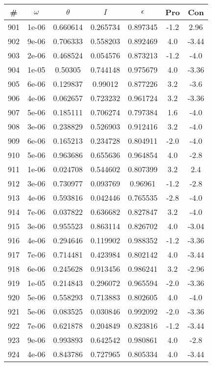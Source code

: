\begin{table}
\begin{tabular}{c|c|c|c|c|c|c}
\# & $\omega$ & $\theta$ & $I$ & $\epsilon$ & Pro & Con\\
\hline
901 & 1e-06 & 0.660614 & 0.265734 & 0.897345 & -1.2 & 2.96\\
902 & 9e-06 & 0.706333 & 0.558203 & 0.892469 & 4.0 & -3.44\\
903 & 2e-06 & 0.468524 & 0.054576 & 0.873213 & -1.2 & -4.0\\
904 & 1e-05 & 0.50305 & 0.744148 & 0.975679 & 4.0 & -3.36\\
905 & 6e-06 & 0.129837 & 0.99012 & 0.877226 & 3.2 & -3.6\\
906 & 4e-06 & 0.062657 & 0.723232 & 0.961724 & 3.2 & -3.36\\
907 & 5e-06 & 0.185111 & 0.706274 & 0.797384 & 1.6 & -4.0\\
908 & 3e-06 & 0.238829 & 0.526903 & 0.912416 & 3.2 & -4.0\\
909 & 6e-06 & 0.165213 & 0.234728 & 0.804911 & -2.0 & -4.0\\
910 & 5e-06 & 0.963686 & 0.655636 & 0.964854 & 4.0 & -2.8\\
911 & 1e-06 & 0.024708 & 0.544602 & 0.807399 & 3.2 & 2.4\\
912 & 3e-06 & 0.730977 & 0.093769 & 0.96961 & -1.2 & -2.8\\
913 & 4e-06 & 0.593816 & 0.042446 & 0.765535 & -2.8 & -4.0\\
914 & 7e-06 & 0.037822 & 0.636682 & 0.827847 & 3.2 & -4.0\\
915 & 3e-06 & 0.955523 & 0.863114 & 0.826702 & 4.0 & -3.04\\
916 & 4e-06 & 0.294646 & 0.119902 & 0.988352 & -1.2 & -3.36\\
917 & 7e-06 & 0.714481 & 0.423984 & 0.802142 & 4.0 & -3.44\\
918 & 6e-06 & 0.245628 & 0.913456 & 0.986241 & 3.2 & -2.96\\
919 & 1e-05 & 0.214843 & 0.296072 & 0.965594 & -2.0 & -3.36\\
920 & 5e-06 & 0.558293 & 0.713883 & 0.802605 & 4.0 & -4.0\\
921 & 5e-06 & 0.083525 & 0.030846 & 0.992092 & -2.0 & -3.36\\
922 & 7e-06 & 0.621878 & 0.204849 & 0.823816 & -1.2 & -3.44\\
923 & 9e-06 & 0.993893 & 0.642542 & 0.980861 & 4.0 & -2.8\\
924 & 4e-06 & 0.843786 & 0.727965 & 0.805334 & 4.0 & -3.44\\

\end{tabular}
\end{table}
